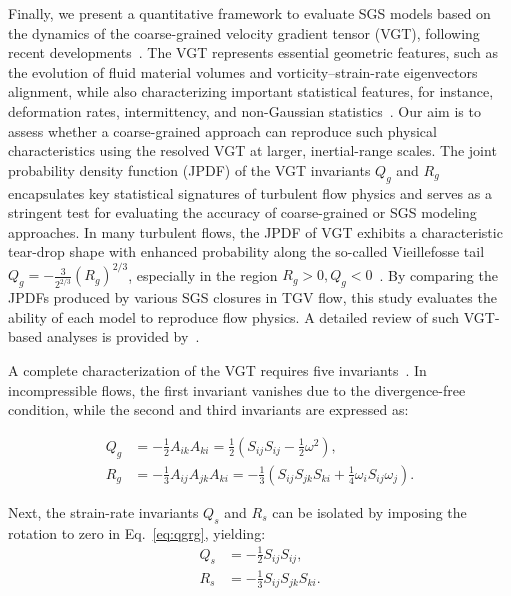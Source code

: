 \documentclass[final,3p]{elsarticle}
\begin{document}
Finally, we present a quantitative framework to evaluate SGS models based on the dynamics of the coarse-grained velocity gradient tensor (VGT), following recent developments~\cite{meneveau2011lagrangian, johnson2024multiscale,singh2025characterization}. The VGT represents essential geometric features, such as the evolution of fluid material volumes and vorticity--strain-rate eigenvectors alignment, while also characterizing important statistical features, for instance, deformation rates, intermittency, and non-Gaussian statistics~\cite{meneveau2011lagrangian}.
Our aim is to assess whether a coarse-grained approach can reproduce such physical characteristics using the resolved VGT at larger, inertial-range scales. The joint probability density function (JPDF) of the VGT invariants \( Q_g \) and \( R_g \) encapsulates key statistical signatures of turbulent flow physics and serves as a stringent test for evaluating the accuracy of coarse-grained or SGS modeling approaches.
In many turbulent flows, the JPDF of VGT exhibits a characteristic tear-drop shape with enhanced probability along the so-called Vieillefosse tail \( Q_g = -\tfrac{3}{2^{2/3}} (R_g)^{2/3} \), especially in the region \( R_g > 0, Q_g < 0 \)~\cite{vieillefosse1984internal,cantwell1993behavior, chong1990general}. By comparing the JPDFs produced by various SGS closures in TGV flow, this study evaluates the ability of each model to reproduce flow physics. A detailed review of such VGT-based analyses is provided by~\citet{singh2025characterization}.


A complete characterization of the VGT requires five invariants~\cite{meneveau2011lagrangian,johnson2024multiscale}. In incompressible flows, the first invariant vanishes due to the divergence-free condition, while the second and third invariants are expressed as:

\begin{align}
	Q_g &= -\frac{1}{2} A_{ik} A_{ki} = \frac{1}{2} \left( S_{ij} S_{ij} - \frac{1}{2} \omega^2 \right), \nonumber \\
	R_g &= -\frac{1}{3} A_{ij} A_{jk} A_{ki} = -\frac{1}{3} \left( S_{ij} S_{jk} S_{ki} + \frac{1}{4} \omega_i S_{ij} \omega_j \right).
	\label{eq:qgrg}
\end{align}

Next, the strain-rate invariants $Q_s$ and $R_s$ can be isolated by imposing the rotation to zero in Eq.~\ref{eq:qgrg}, yielding:
\begin{align}
	Q_s &= -\frac{1}{2} S_{ij} S_{ij}, \nonumber \\
	R_s &= -\frac{1}{3}S_{ij} S_{jk} S_{ki}.
	\label{eq:qsrs}
\end{align}
\end{document}
